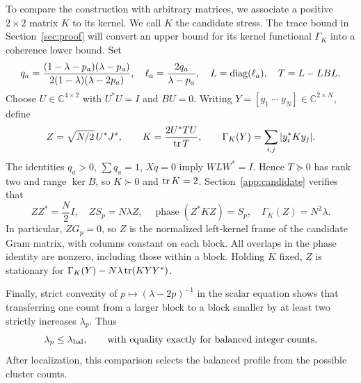 To compare the construction with arbitrary matrices, we associate a
positive $2\times2$ matrix $K$ to its kernel. We call $K$ the candidate
stress. The trace bound in Section~\ref{sec:proof} will convert an upper
bound for its kernel functional $\Gamma_K$ into a coherence lower bound.
Set
\[
 q_a=\frac{(1-\lambda-p_a)(\lambda-p_a)}
 {2(1-\lambda)(\lambda-2p_a)},\quad
 \ell_a=\frac{2q_a}{\lambda-p_a},\quad
 L=\operatorname{diag}(\ell_a),\quad T=L-LBL.
\]
Choose $U\in\mathbb C^{4\times2}$ with $U^*U=I$ and $BU=0$.
Writing $Y=[y_1\ \cdots\ y_N]\in\mathbb C^{2\times N}$, define
\begin{equation}\label{eq:candidate-stress}
 Z=\sqrt{N/2}\,U^*J^*,\qquad
 K=\frac{2U^*TU}{\operatorname{tr} T},\qquad
 \Gamma_K(Y)=\sum_{i,j}|y_i^*Ky_j|.
\end{equation}
The identities $q_a>0$, $\sum q_a=1$, $Xq=0$ imply $WLW^*=I$.
Hence $T\succeq0$ has rank two and range $\ker B$, so $K\succ0$ and
$\operatorname{tr} K=2$. Section~\ref{app:candidate} verifies that
\begin{equation}\label{eq:stress-identities}
 ZZ^*=\frac N2I,\quad ZS_p=N\lambda Z,\quad
 \operatorname{phase}(Z^*KZ)=S_p,\quad
 \Gamma_K(Z)=N^2\lambda.
\end{equation}
In particular, $ZG_p=0$, so $Z$ is the normalized left-kernel frame of
the candidate Gram matrix, with columns constant on each block.
All overlaps in the phase identity are nonzero, including those within
a block. Holding $K$ fixed, $Z$ is stationary for
$\Gamma_K(Y)-N\lambda\operatorname{tr}(KYY^*)$.

Finally, strict convexity of $p\mapsto(\lambda-2p)^{-1}$ in the scalar
equation shows that transferring one count from a larger block to a
block smaller by at least two strictly increases $\lambda_p$.
Thus
\begin{equation}\label{eq:strict-balancing}
 \lambda_p\le\lambda_{\rm bal},
 \qquad\text{with equality exactly for balanced integer counts.}
\end{equation}
After localization, this comparison selects the balanced profile from
the possible cluster counts.
